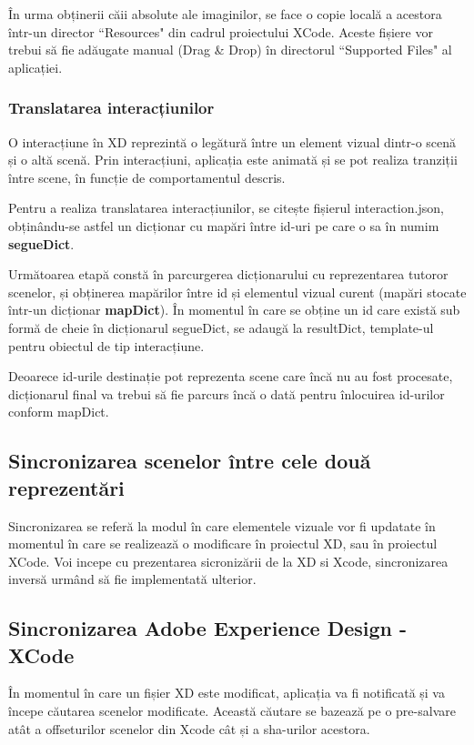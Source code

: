 În urma obținerii căii absolute ale imaginilor, se face o copie locală a acestora într-un director ``Resources" din cadrul proiectului XCode. Aceste fișiere vor trebui să fie adăugate manual (Drag & Drop) în directorul ``Supported Files" al aplicației.

\subsubsection{Translatarea interacțiunilor}

O interacțiune în XD reprezintă o legătură între un element vizual dintr-o scenă și o altă scenă. Prin interacțiuni, aplicația este animată și se pot realiza tranziții între scene, în funcție de comportamentul descris. 

Pentru a realiza translatarea interacțiunilor, se citește fișierul interaction.json, obținându-se astfel un dicționar cu mapări între id-uri pe care o sa în numim \textbf{segueDict}. 

Următoarea etapă constă în parcurgerea dicționarului cu reprezentarea tutoror scenelor, și obținerea mapărilor între id și elementul vizual curent (mapări stocate într-un dicționar \textbf{mapDict}). În momentul în care se obține un id care există sub formă de cheie în dicționarul segueDict, se adaugă la resultDict, template-ul pentru obiectul de tip interacțiune. 

Deoarece id-urile destinație pot reprezenta scene care încă nu au fost procesate, dicționarul final va trebui să fie parcurs încă o dată pentru înlocuirea id-urilor conform mapDict.

\subsection{Sincronizarea scenelor între cele două reprezentări}

Sincronizarea se referă la modul în care elementele vizuale vor fi updatate în momentul în care se realizează o modificare în proiectul XD, sau în proiectul XCode.
Voi incepe cu prezentarea sicronizării de la XD si Xcode, sincronizarea inversă urmând să fie implementată ulterior.

\subsection{Sincronizarea Adobe Experience Design - XCode}

În momentul în care un fișier XD este modificat, aplicația va fi notificată și va începe căutarea scenelor modificate. Această căutare se bazează pe o pre-salvare atât a offseturilor scenelor din Xcode cât și a sha-urilor acestora. 

